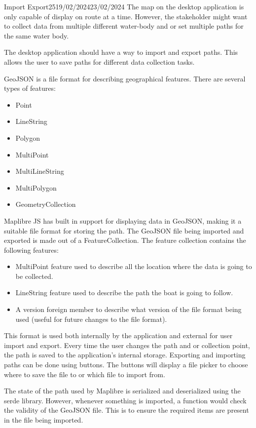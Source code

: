\documentclass[12pt]{article}
\begin{document}
\begin{logbook-entry}{Import Export}{25}{19/02/2024}{23/02/2024}
The map on the desktop application is only capable of display on route at a time.
However, the stakeholder might want to collect data from multiple different water-body and or set multiple paths for the same water body.

The desktop application should have a way to import and export paths.
This allows the user to save paths for different data collection tasks.

GeoJSON is a file format for describing geographical features.
There are several types of features:

\begin{itemize}
    \item Point
    \item LineString
    \item Polygon
    \item MultiPoint
    \item MultiLineString
    \item MultiPolygon
    \item GeometryCollection
\end{itemize}

Maplibre JS has built in support for displaying data in GeoJSON, making it a suitable file format for storing the path.
The GeoJSON file being imported and exported is made out of a FeatureCollection.
The feature collection contains the following features:

\begin{itemize}
    \item MultiPoint feature used to describe all the location where the data is going to be collected.
    \item LineString feature used to describe the path the boat is going to follow.
    \item A version foreign member to describe what version of the file format being used (useful for future changes to the file format).
\end{itemize}

This format is used both internally by the application and external for user import and export.
Every time the user changes the path and or collection point, the path is saved to the application's internal storage.
Exporting and importing paths can be done using buttons.
The buttons will display a file picker to choose where to save the file to or which file to import from.

The state of the path used by Maplibre is serialized and deserialized using the serde library.
However, whenever something is imported, a function would check the validity of the GeoJSON file.
This is to ensure the required items are present in the file being imported.


\end{logbook-entry}
\end{document}
